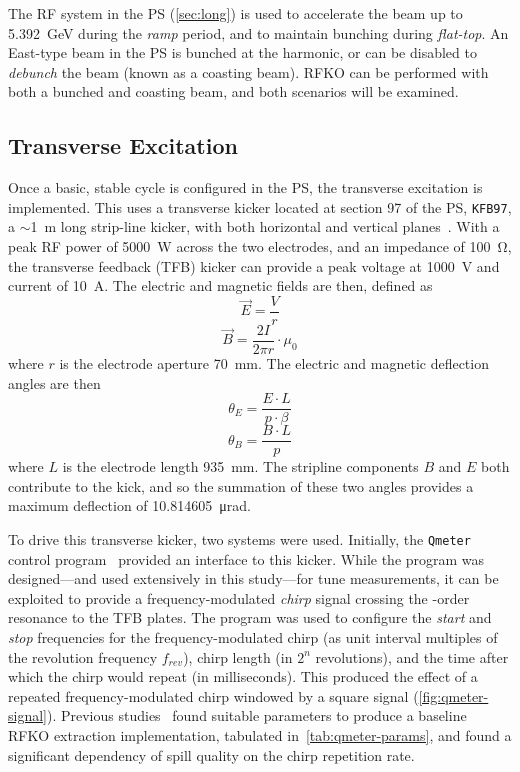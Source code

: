 \documentclass[11pt]{report}
\begin{document}
The RF system in the PS (\autoref{sec:long}) is used to accelerate the beam up to \qty{5.392}{\giga\electronvolt} during the \textit{ramp} period, and to maintain bunching during \textit{flat-top}. An East-type beam in the PS is bunched at the  harmonic, or can be disabled to \textit{debunch} the beam (known as a coasting beam). RFKO can be performed with both a bunched and coasting beam, and both scenarios will be examined.

\subsection{Transverse Excitation}\label{sec:trans_exc}
Once a basic, stable cycle is configured in the PS, the transverse excitation is implemented. This uses a transverse kicker located at section 97 of the PS, \verb|KFB97|, a $\sim$\qty{1}{\meter} long strip-line kicker, with both horizontal and vertical planes~\cite{Sterbini:2158994}. With a peak RF power of \qty{5000}{\watt} across the two electrodes, and an impedance of \qty{100}{\ohm}, the transverse feedback (TFB) kicker can provide a peak voltage at \qty{1000}{\volt} and current of \qty{10}{\ampere}. The electric and magnetic fields are then, defined as
\begin{equation}
  \vec E=\frac Vr
\end{equation}
\begin{equation}
  \vec B=\frac {2I}{2\pi r}\cdot \mu_0
\end{equation}
where $r$ is the electrode aperture \qty{70}{\milli\meter}. The electric and magnetic deflection angles are then~\cite[3.1-3.2]{bouvet}
\begin{equation}
  \theta_E = \frac{E \cdot L}{p\cdot\beta}
  \label{eq:kick-electric}
\end{equation}
\begin{equation}
  \theta_B = \frac{B\cdot L}{p}
  \label{eq:kick-magnetic}
\end{equation} where $L$ is the electrode length \qty{935}{\milli\meter}. The stripline components $B$ and $E$ both contribute to the kick, and so the summation of these two angles provides a maximum deflection of \qty{10.814605}{\micro\radian}.

To drive this transverse kicker, two systems were used. Initially, the \verb|Qmeter| control program~\cite{Gasior:895142} provided an interface to this kicker. While the program was designed---and used extensively in this study---for tune measurements, it can be exploited to provide a frequency-modulated \textit{chirp} signal crossing the -order resonance to the TFB plates. The program was used to configure the \textit{start} and \textit{stop} frequencies for the frequency-modulated chirp (as unit interval multiples of the revolution frequency $f_{rev}$), chirp length (in $2^n$ revolutions), and the time after which the chirp would repeat (in milliseconds). This produced the effect of a repeated frequency-modulated chirp windowed by a square signal (\autoref{fig:qmeter-signal}). Previous studies~\cite{ipac} found suitable parameters to produce a baseline RFKO extraction implementation, tabulated in~\autoref{tab:qmeter-params}, and found a significant dependency of spill quality on the chirp repetition rate.
\end{document}
